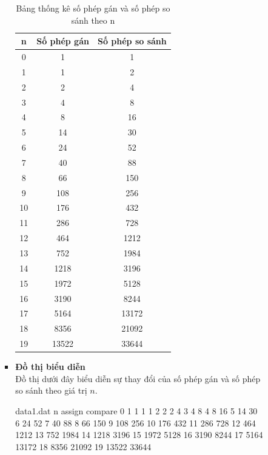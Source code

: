 \documentclass[12pt,a4paper]{article}
\begin{document}
\begin{enumerate}[label=\textbf{Câu 2:} ]
\begin{enumerate}[label=\textbf{Câu 3:} ]
\begin{enumerate}[label=\alph*)]
\begin{itemize}
\begin{table}[h!]
    \centering
    \begin{tabular}{|c|c|c|}
        \hline
        \textbf{n} & \textbf{Số phép gán} & \textbf{Số phép so sánh} \\
        \hline
        0 & 1 & 1 \\
        1 & 1 & 2 \\
        2 & 2 & 4 \\
        3 & 4 & 8 \\
        4 & 8 & 16 \\
        5 & 14 & 30 \\
        6 & 24 & 52 \\
        7 & 40 & 88 \\
        8 & 66 & 150 \\
        9 & 108 & 256 \\
        10 & 176 & 432 \\
        11 & 286 & 728 \\
        12 & 464 & 1212 \\
        13 & 752 & 1984 \\
        14 & 1218 & 3196 \\
        15 & 1972 & 5128 \\
        16 & 3190 & 8244 \\
        17 & 5164 & 13172 \\
        18 & 8356 & 21092 \\
        19 & 13522 & 33644 \\
        \hline
    \end{tabular}
    \caption{Bảng thống kê số phép gán và số phép so sánh theo n}
\end{table}
\item \textbf{Đồ thị biểu diễn}\\
Đồ thị dưới đây biểu diễn sự thay đổi của số phép gán và số phép so sánh theo giá trị \(n\).
\newpage 
\begin{filecontents*}{data1.dat}
n assign compare
0 1 1
1 1 2
2 2 4
3 4 8
4 8 16
5 14 30
6 24 52
7 40 88
8 66 150
9 108 256
10 176 432
11 286 728
12 464 1212
13 752 1984
14 1218 3196
15 1972 5128
16 3190 8244
17 5164 13172
18 8356 21092
19 13522 33644
\end{filecontents*}


\end{itemize}
\end{enumerate}
\end{enumerate}
\end{enumerate}
\end{document}

